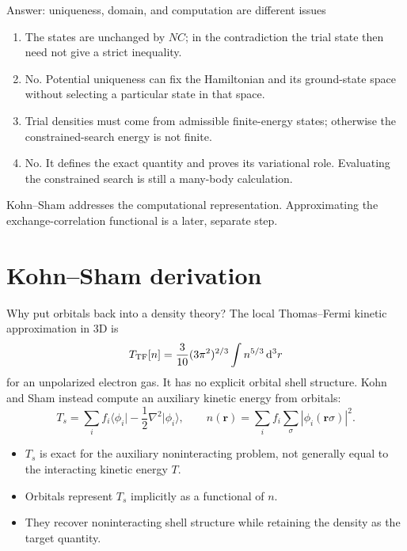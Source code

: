 \documentclass[aspectratio=169,10pt]{beamer}
\newcommand{\dftbox}[1]{\begin{tcolorbox}[colback=paleteal,colframe=teal,title={Key result}]#1\end{tcolorbox}}
\newcommand{\dd}{\,\mathrm d}
\newcommand{\rr}{\mathbf r}
\newcommand{\ket}[1]{\lvert #1\rangle}
\newcommand{\bra}[1]{\langle #1\rvert}
\begin{document}
\begin{frame}{Answer: uniqueness, domain, and computation are different issues}
\begin{enumerate}
\item The states are unchanged by $NC$; in the contradiction the trial state
then need not give a strict inequality.
\item No. Potential uniqueness can fix the Hamiltonian and its ground-state
space without selecting a particular state in that space.
\item Trial densities must come from admissible finite-energy states; otherwise
the constrained-search energy is not finite.
\item No. It defines the exact quantity and proves its variational role.
Evaluating the constrained search is still a many-body calculation.
\end{enumerate}
\dftbox{Kohn--Sham addresses the computational representation. Approximating
the exchange-correlation functional is a later, separate step.}
\end{frame}

\section{Kohn--Sham derivation}
\begin{frame}{Why put orbitals back into a density theory?}
The local Thomas--Fermi kinetic approximation in 3D is
\[
 T_{\rm TF}[n]=\frac3{10}(3\pi^2)^{2/3}\int n^{5/3}\dd^3r
\]
for an unpolarized electron gas. It has no explicit orbital shell structure.
Kohn and Sham instead compute an auxiliary kinetic energy from orbitals:
\[
 T_s=\sum_i f_i\bra{\phi_i}-\frac12\nabla^2\ket{\phi_i},\qquad
 n(\rr)=\sum_i f_i\sum_\sigma|\phi_i(\rr\sigma)|^2.
\]
\begin{itemize}
\item $T_s$ is exact for the auxiliary noninteracting problem, not generally
equal to the interacting kinetic energy $T$.
\item Orbitals represent $T_s$ implicitly as a functional of $n$.
\item They recover noninteracting shell structure while retaining the density
as the target quantity.
\end{itemize}
\end{frame}
\end{document}
